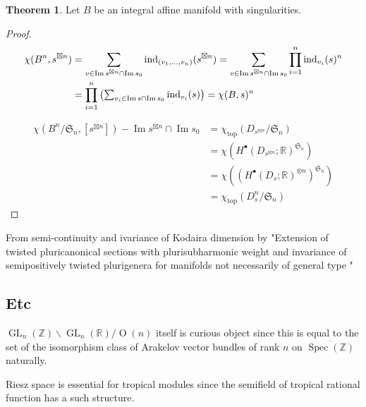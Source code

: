 \documentclass[a4paper,dvipdfmx,reqno,12pt]{amsart}
\theoremstyle{definition}
\newtheorem{Thm}{Theorem}[section]
\newcommand{\R}{\mathbb{R}}%
\newcommand{\Z}{\mathbb{Z}}%
\newcommand{\mf}[1]{\mathfrak{#1}}%
\newcommand{\opn}[1]{\operatorname{#1}}
\numberwithin{equation}{section}
\begin{document}
\begin{Thm}
  Let $B$ be an integral affine manifold with singularities.



\end{Thm}
\begin{proof}

  \begin{align}
    \chi(B^{n},s^{\boxtimes n})
     & =\sum_{v\in \opn{Im}s^{\boxtimes n}\cap \opn{Im}s_0}
    \opn{ind}_{(v_1,\ldots,v_n)}(s^{\boxtimes n})
    =\sum_{v\in \opn{Im}s^{\boxtimes n}\cap \opn{Im}s_0}
    \prod_{i=1}^{n}\opn{ind}_{v_i}(s)^{n}                                                               \\
     & =\prod_{i=1}^{n}\mqty({\sum_{v_i\in \opn{Im}s\cap \opn{Im}s_0}\opn{ind}_{v_i}(s)})=\chi(B,s)^{n}
  \end{align}

  \begin{align}
    \chi(B^{n}/\mf{S}_n,[s^{\boxtimes n}])-\opn{Im}s^{\boxtimes n} \cap \opn{Im}s_0
     & = \chi_{\opn{top}}(D_{s^{\boxtimes n}}/\mf{S}_n)      \\
     & =\chi(H^{\bullet}(D_{s^{\boxtimes n}};\R)^{\mf{S}_n}) \\
     & =\chi((H^{\bullet}(D_s;\R)^{\otimes n})^{\mf{S}_n})   \\
     & =\chi_{\opn{top}}(D_s^{n}/\mf{S}_n)
  \end{align}

\end{proof}
From semi-continuity and ivariance of Kodaira dimension 
by "Extension of twisted pluricanonical sections
with plurisubharmonic weight and invariance of
semipositively twisted plurigenera for manifolds
not necessarily of general type
"

\subsection{Etc}

$\opn{GL}_{n}(\Z)\backslash \opn{GL}_{n}(\R)/\opn{O}(n)$ itself
is curious object since this is equal to the set of
the isomorphism class of Arakelov vector bundles of rank $n$ on $\overline{\opn{Spec}(\Z)}$ naturally.

Riesz space is essential for tropical modules since the semifield of tropical rational function
has a such structure.
\end{document}
